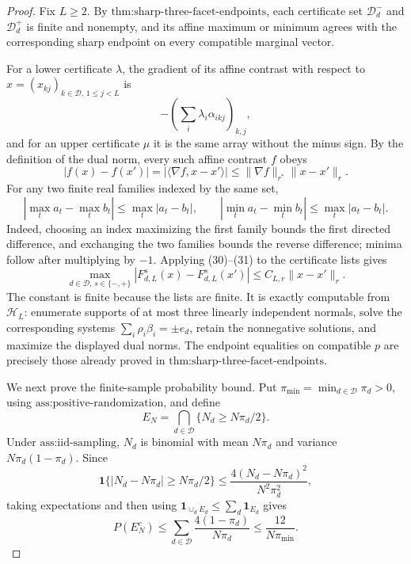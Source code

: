 \documentclass{article}
\begin{document}
\begin{proof}
Fix \(L\geq2\).  By \(\text{thm:sharp-three-facet-endpoints}\), each certificate set \(\mathcal D_d^-\) and \(\mathcal D_d^+\) is finite and nonempty, and its affine maximum or minimum agrees with the corresponding sharp endpoint on every compatible marginal vector.

For a lower certificate \(\lambda\), the gradient of its affine contrast with respect to \(x=(x_{kj})_{k\in\mathcal D,\,1\leq j<L}\) is
\[
 -\left(\sum_i\lambda_i\alpha_{ikj}\right)_{k,j},
\]
and for an upper certificate \(\mu\) it is the same array without the minus sign.  By the definition of the dual norm, every such affine contrast \(f\) obeys
\[
 |f(x)-f(x')|
 =|\langle\nabla f,x-x'\rangle|
 \leq\|\nabla f\|_{r^*}\|x-x'\|_r.                                      \tag{30}
\]
For any two finite real families indexed by the same set,
\[
 \left|\max_t a_t-\max_t b_t\right|\leq\max_t|a_t-b_t|,
 \qquad
 \left|\min_t a_t-\min_t b_t\right|\leq\max_t|a_t-b_t|.                 \tag{31}
\]
Indeed, choosing an index maximizing the first family bounds the first directed difference, and exchanging the two families bounds the reverse difference; minima follow after multiplying by \(-1\).  Applying (30)--(31) to the certificate lists gives
\[
 \max_{d\in\mathcal D,\,s\in\{-,+\}}
 |F_{d,L}^s(x)-F_{d,L}^s(x')|
 \leq C_{L,r}\|x-x'\|_r.                                                  \tag{32}
\]
The constant is finite because the lists are finite.  It is exactly computable from \(\mathcal H_L\): enumerate supports of at most three linearly independent normals, solve the corresponding systems \(\sum_i\rho_i\beta_i=\pm e_d\), retain the nonnegative solutions, and maximize the displayed dual norms.  The endpoint equalities on compatible \(p\) are precisely those already proved in \(\text{thm:sharp-three-facet-endpoints}\).

We next prove the finite-sample probability bound.  Put \(\pi_{\min}=\min_{d\in\mathcal D}\pi_d>0\), using \(\text{ass:positive-randomization}\), and define
\[
 E_N=\bigcap_{d\in\mathcal D}\{N_d\geq N\pi_d/2\}.
\]
Under \(\text{ass:iid-sampling}\), \(N_d\) is binomial with mean \(N\pi_d\) and variance \(N\pi_d(1-\pi_d)\).  Since
\[
 \mathbf 1\{|N_d-N\pi_d|\geq N\pi_d/2\}
 \leq \frac{4(N_d-N\pi_d)^2}{N^2\pi_d^2},
\]
taking expectations and then using \(\mathbf 1_{\cup_d E_d}\leq\sum_d\mathbf 1_{E_d}\) gives
\[
 P(E_N^c)
 \leq\sum_{d\in\mathcal D}\frac{4(1-\pi_d)}{N\pi_d}
 \leq\frac{12}{N\pi_{\min}}.                                              \tag{33}
\]


\end{proof}
\end{document}
